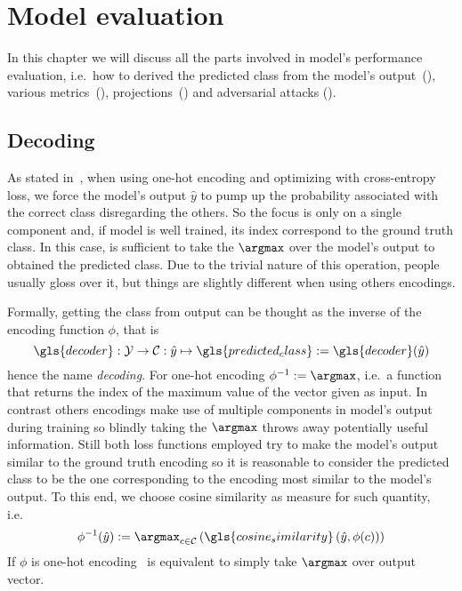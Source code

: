 \chapter{Model evaluation}
\label{ch:model-evaluation}

In this chapter we will discuss all the parts involved in model's performance
evaluation, i.e.\ how to derived the predicted class from the model's
output~(), various metrics~(),
projections~() and adversarial attacks
().

\section{Decoding}
\label{sec:decoding}
As stated in~, when using one-hot encoding and
optimizing with cross-entropy loss, we force the model's output $\hat{y}$ to
pump up the probability associated with the correct class disregarding the
others. So the focus is only on a single component and, if model is well
trained, its index correspond to the ground truth class. In this case, is
sufficient to take the $\argmax$ over the model's output to obtained the
predicted class. Due to the trivial nature of this operation, people usually
gloss over it, but things are slightly different when using others
encodings.\medskip

Formally, getting the class from output can be thought as the inverse of the
encoding function $\phi$, that is
\begin{equation}
  \gls{decoder} : \mathcal{Y} \to \mathcal{C}
  : \hat{y} \mapsto \gls{predicted_class} := \gls{decoder}(\hat{y})
  \label{eq:decoding}
\end{equation}
hence the name \emph{decoding}. For one-hot encoding $\phi^{-1} := \argmax$,
i.e.\ a function that returns the index of the maximum value of the vector given
as input. In contrast others encodings make use of multiple components in
model's output during training so blindly taking the $\argmax$ throws away
potentially useful information. Still both loss functions employed try to make
the model's output similar to the ground truth encoding so it is reasonable to
consider the predicted class to be the one corresponding to the encoding most
similar to the model's output. To this end, we choose cosine similarity as
measure for such quantity, i.e.\
\begin{equation}
  \phi^{-1}(\hat{y}) := \argmax_{c \in \mathcal{C}}
  \left( \gls{cosine_similarity} \left(\hat{y}, \phi(c) \right) \right)
  \label{eq:decoding-cos-sim}
\end{equation}
If $\phi$ is one-hot encoding~ is equivalent to simply
take $\argmax$ over output vector.

